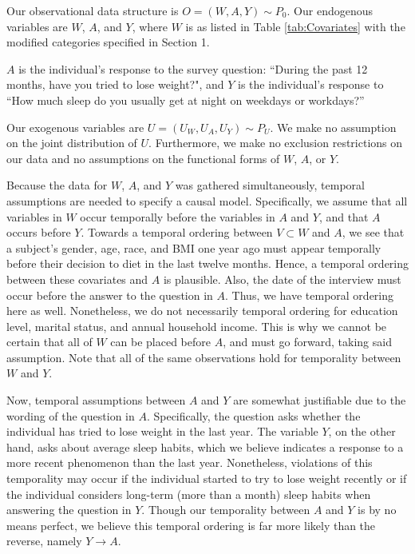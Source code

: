 \documentclass{article}
\begin{document}
Our observational data structure is $O=(W,A,Y) \sim P_0$. Our endogenous variables are $W$, $A$, and $Y$, where $W$ is as listed in Table \ref{tab:Covariates}  with the modified categories specified in Section 1.

$A$ is the individual's response to the survey question: ``During the past 12 months, have you tried to lose weight?", and $Y$ is the individual's response to ``How much sleep do you usually get at night on weekdays or workdays?''  

Our exogenous variables are $U = (U_W, U_A, U_Y) \sim P_U$. We make no assumption on the joint distribution of $U$. Furthermore, we make no exclusion restrictions on our data and no assumptions on the functional forms of $W$, $A$, or $Y$.

Because the data for $W$, $A$, and $Y$ was gathered simultaneously, temporal assumptions are needed to specify a causal model. Specifically, we assume that all variables in $W$ occur temporally before the variables in $A$ and $Y$, and that $A$ occurs before $Y$. Towards a temporal ordering between $V \subset W$ and $A$, we see that a subject's gender, age, race, and BMI one year ago must appear temporally before their decision to diet in the last twelve months. Hence, a temporal ordering between these covariates and $A$ is plausible. Also, the date of the interview must occur before the answer to the question in $A$. Thus, we have temporal ordering here as well. Nonetheless, we do not necessarily temporal ordering for education level, marital status, and annual household income. This is why we cannot be certain that all of $W$ can be placed before $A$, and must go forward, taking said assumption. Note that all of the same observations hold for temporality between $W$ and $Y$.

Now, temporal assumptions between $A$ and $Y$ are somewhat justifiable due to the wording of the question in $A$. Specifically, the question asks whether the individual has tried to lose weight in the last year. The variable $Y$, on the other hand, asks about average sleep habits, which we believe indicates a response to a more recent phenomenon than the last year. Nonetheless, violations of this temporality may occur if the individual started to try to lose weight recently or if the individual considers long-term (more than a month) sleep habits when answering the question in $Y$. Though our temporality between $A$ and $Y$ is by no means perfect, we believe this temporal ordering is far more likely than the reverse, namely $Y\rightarrow A$. 
\end{document}
